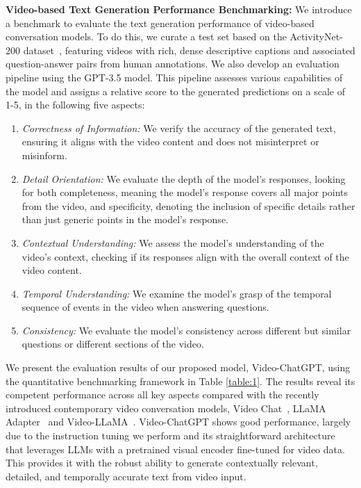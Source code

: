 \noindent\textbf{Video-based Text Generation Performance Benchmarking: }
We introduce a benchmark to evaluate the text generation performance of video-based conversation models. To do this, we curate a test set based on the ActivityNet-200 dataset~\cite{caba2015activitynet}, featuring videos with rich, dense descriptive captions and associated question-answer pairs from human annotations. We also develop an evaluation pipeline using the GPT-3.5 model. This pipeline assesses various capabilities of the model and assigns a relative score to the generated predictions on a scale of 1-5, in the following five aspects:
\begin{enumerate}[label=(\roman*)] %
    \item \textit{Correctness of Information:} We verify the accuracy of the generated text, ensuring it aligns with the video content and does not misinterpret or misinform.
    \item \textit{Detail Orientation:} We evaluate the depth of the model's responses, looking for both completeness, meaning the model's response covers all major points from the video, and specificity, denoting the inclusion of specific details rather than just generic points in the model's response.
    \item \textit{Contextual Understanding:} We assess the model's understanding of the video's context, checking if its responses align with the overall context of the video content.
    \item \textit{Temporal Understanding:} We examine the model's grasp of the temporal sequence of events in the video when answering questions.
    \item \textit{Consistency:} We evaluate the model's consistency across different but similar questions or different sections of the video.
\end{enumerate}

We present the evaluation results of our proposed model, Video-ChatGPT, using the quantitative benchmarking framework in Table \ref{table:1}. The results reveal its competent performance across all key aspects compared with the recently introduced contemporary video conversation models, Video Chat~\cite{2023videochat}, LLaMA Adapter~\cite{gao2023llamaadapterv2} and Video-LLaMA~\cite{damonlpsg2023videollama}. Video-ChatGPT shows good performance, largely due to the instruction tuning we perform and its straightforward architecture that leverages LLMs with a pretrained visual encoder fine-tuned for video data. This provides it with the robust ability to generate contextually relevant, detailed, and temporally accurate text from video input.

